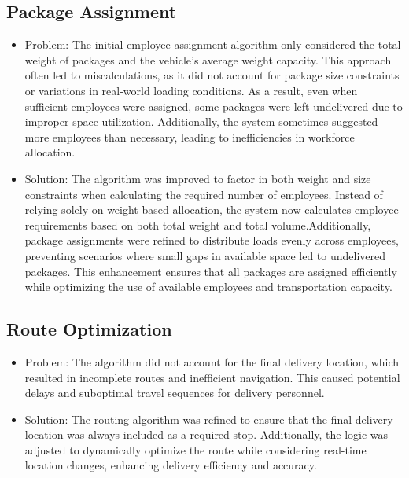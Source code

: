 \subsection{Package Assignment}
\begin{itemize}
    \item Problem: The initial employee assignment algorithm only considered the total weight of packages and the vehicle’s average weight capacity. This approach often led to miscalculations, as it did not account for package size constraints or variations in real-world loading conditions. As a result, even when sufficient employees were assigned, some packages were left undelivered due to improper space utilization. Additionally, the system sometimes suggested more employees than necessary, leading to inefficiencies in workforce allocation.

    \item Solution: The algorithm was improved to factor in both weight and size constraints when calculating the required number of employees. Instead of relying solely on weight-based allocation, the system now calculates employee requirements based on both total weight and total volume.Additionally, package assignments were refined to distribute loads evenly across employees, preventing scenarios where small gaps in available space led to undelivered packages. This enhancement ensures that all packages are assigned efficiently while optimizing the use of available employees and transportation capacity.
\end{itemize}
\subsection{Route Optimization}
\begin{itemize}
    \item Problem: The algorithm did not account for the final delivery location, which resulted in incomplete routes and inefficient navigation. This caused potential delays and suboptimal travel sequences for delivery personnel.
    \item Solution: The routing algorithm was refined to ensure that the final delivery location was always included as a required stop. Additionally, the logic was adjusted to dynamically optimize the route while considering real-time location changes, enhancing delivery efficiency and accuracy.
\end{itemize}
